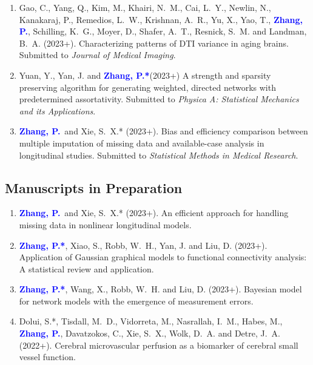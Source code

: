 \documentclass[12pt]{article}
\newcommand{\PZ}{\textcolor{blue}{\textbf{Zhang, P.*}}}
\newcommand{\PZnot}{\textcolor{blue}{\textbf{Zhang, P.}}}
\begin{document}
\begin{enumerate}
		\item {\sc Gao, C., Yang, Q., Kim, M., Khairi, N.\ M., Cai, 
		L.\ Y., Newlin, N., Kanakaraj, P., Remedios, L.\ W., 
		Krishnan, A.\ R., Yu, X., Yao, T.,} \PZnot, {\sc Schilling, 
		K.\ G., Moyer, D., Shafer, A.\ T., Resnick, S.\ M.} and {\sc 
		Landman, B.\ A.} (2023+). Characterizing patterns of DTI 
		variance in aging brains. Submitted to {\em Journal of 
		Medical Imaging}.
		
		\item {\sc Yuan, Y., Yan, J.} and \PZ (2023+) A strength 
		and sparsity preserving algorithm for generating weighted, 
		directed networks with predetermined assortativity. 
		Submitted to {\em Physica A: Statistical Mechanics and its 
		Applications}.

		\item \PZnot\ and {\sc Xie, S.\ X.*} (2023+). Bias 
		and efficiency comparison between multiple imputation of 
		missing data and available-case analysis in longitudinal 
		studies. Submitted to {\em Statistical Methods in Medical 
		Research}.
	\end{enumerate}
	
	\subsection*{Manuscripts in Preparation}
	\begin{enumerate}
		\item \PZnot\ and {\sc Xie, S.\ X.*} (2023+). An efficient 
		approach for handling missing data in nonlinear longitudinal
		models.	
		
		\item \PZ, {\sc Xiao, S., Robb, W.\ H., Yan, J.} and {\sc 
		Liu, D.} (2023+).
		Application of Gaussian graphical models to functional 
		connectivity analysis: A statistical review and application.
		
		\item \PZ, {\sc Wang, X., Robb, W.\ H.} and {\sc Liu, D.} 
		(2023+). Bayesian model for network models with the 
		emergence of measurement errors.
		
		\item {\sc Dolui, S.*, Tisdall, M.\ D., Vidorreta, M., Nasrallah, I.\ M., Habes, M.}, \PZnot, {\sc Davatzokos, C., Xie, S.\ X., Wolk, D.\ A.} and {\sc Detre, J.\ A.} 
		(2022+). Cerebral microvascular perfusion as a biomarker of 
		cerebral small vessel function.
	\end{enumerate}
	
\end{document}
